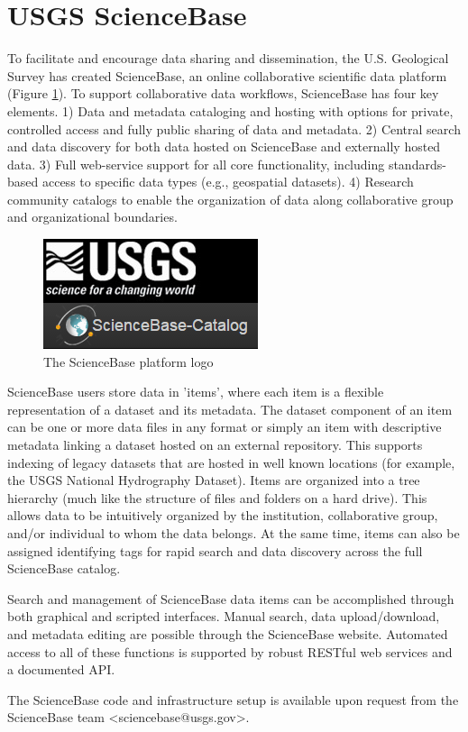 \section{USGS ScienceBase}

To facilitate and encourage data sharing and dissemination,
the U.S. Geological Survey has created ScienceBase, an online
collaborative scientific data platform (Figure \ref{figure:sbfig}). To support collaborative
data workflows, ScienceBase has four key elements. 1) Data and metadata
cataloging and hosting with options for private, controlled access
and fully public sharing of data and metadata. 2) Central search and
data discovery for both data hosted on ScienceBase and externally hosted 
data. 3) Full web-service support for all core functionality, including
standards-based access to specific data types (e.g., geospatial
datasets). 4) Research community catalogs to
enable the organization of data along collaborative group and
organizational boundaries.

 \begin{figure}[htbp]
   \centering
   \includegraphics{sblogo}
   \caption{The ScienceBase platform logo}
   \label{figure:sbfig}
 \end{figure}

ScienceBase users store data in 'items', where each item is a flexible
representation of a dataset and its metadata. The dataset component of an
item can be one or more data files in any format or simply an item with descriptive
metadata linking a dataset hosted on an external repository. This supports
indexing of legacy datasets that are hosted in well known locations (for example, 
the USGS National Hydrography Dataset). Items are organized into a tree hierarchy 
(much like the structure of files and
folders on a hard drive). This allows data to be intuitively organized by the
institution, collaborative group, and/or individual to whom
the data belongs. At the same time, items can also be assigned identifying tags
for rapid search and data discovery across the full ScienceBase catalog.

Search and management of ScienceBase data items can be accomplished through
both graphical and scripted interfaces. Manual search, data upload/download, and
metadata editing are possible through the ScienceBase website.
Automated access to all of these functions is supported by robust RESTful web
services and a documented API.

The ScienceBase code and infrastructure setup is available upon
request from the ScienceBase team <sciencebase@usgs.gov>.
